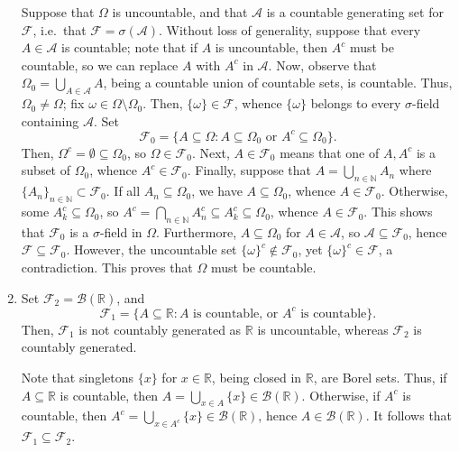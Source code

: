 \documentclass[11pt]{article}
\newcommand{\N}{\mathbb{N}}
\newcommand{\R}{\mathbb{R}}
\begin{document}
\begin{enumerate}
        Suppose that $\Omega$ is uncountable, and that $\mathcal{A}$ is a
        countable generating set for $\mathcal{F}$, i.e.\ that $\mathcal{F} =
        \sigma(\mathcal{A})$.
        Without loss of generality, suppose that every $A \in \mathcal{A}$ is
        countable; note that if $A$ is uncountable, then $A^c$ must be
        countable, so we can replace $A$ with $A^c$ in $\mathcal{A}$.
        Now, observe that $\Omega_0 = \bigcup_{A \in \mathcal{A}} A$, being a
        countable union of countable sets, is countable.
        Thus, $\Omega_0 \neq \Omega$; fix $\omega \in
        \Omega\setminus\Omega_0$.
        Then, $\{\omega\} \in \mathcal{F}$, whence $\{\omega\}$ belongs to
        every $\sigma$-field containing $\mathcal{A}$.
        Set \[
            \mathcal{F}_0 = \{A \subseteq \Omega\colon A \subseteq \Omega_0 \text{ or } A^c \subseteq \Omega_0\}.
        \] Then, $\Omega^c = \emptyset \subseteq \Omega_0$, so $\Omega \in
        \mathcal{F}_0$.
        Next, $A \in \mathcal{F}_0$ means that one of $A, A^c$ is a subset of
        $\Omega_0$, whence $A^c \in \mathcal{F}_0$.
        Finally, suppose that $A = \bigcup_{n \in \N} A_n$ where $\{A_n\}_{n
        \in \N} \subset \mathcal{F}_0$.
        If all $A_n \subseteq \Omega_0$, we have $A \subseteq \Omega_0$,
        whence $A \in \mathcal{F}_0$.
        Otherwise, some $A_k^c \subseteq \Omega_0$, so $A^c = \bigcap_{n \in
        \N} A_n^c \subseteq A_k^c \subseteq \Omega_0$, whence $A \in
        \mathcal{F}_0$.
        This shows that $\mathcal{F}_0$ is a $\sigma$-field in $\Omega$.
        Furthermore, $A \subseteq \Omega_0$ for $A \in \mathcal{A}$, so
        $\mathcal{A} \subseteq \mathcal{F}_0$, hence $\mathcal{F} \subseteq
        \mathcal{F}_0$.
        However, the uncountable set $\{\omega\}^c \notin \mathcal{F}_0$, yet
        $\{\omega\}^c \in \mathcal{F}$, a contradiction.
        This proves that $\Omega$ must be countable.


        \item Set $\mathcal{F}_2 = \mathcal{B}(\R)$, and \[
            \mathcal{F}_1 = \{A \subseteq \R\colon A\text{ is countable, or }A^c\text{ is countable}\}.
        \] Then, $\mathcal{F}_1$ is not countably generated as $\R$ is
        uncountable, whereas $\mathcal{F}_2$ is countably generated.

        Note that singletons $\{x\}$ for $x \in \R$, being closed in $\R$, are
        Borel sets.
        Thus, if $A \subseteq \R$ is countable, then $A = \bigcup_{x \in A}
        \{x\} \in \mathcal{B}(\R)$.
        Otherwise, if $A^c$ is countable, then $A^c = \bigcup_{x \in A^c}
        \{x\} \in \mathcal{B}(\R)$, hence $A \in \mathcal{B}(\R)$.
        It follows that $\mathcal{F}_1 \subseteq \mathcal{F}_2$.

    \end{enumerate}
\end{document}
